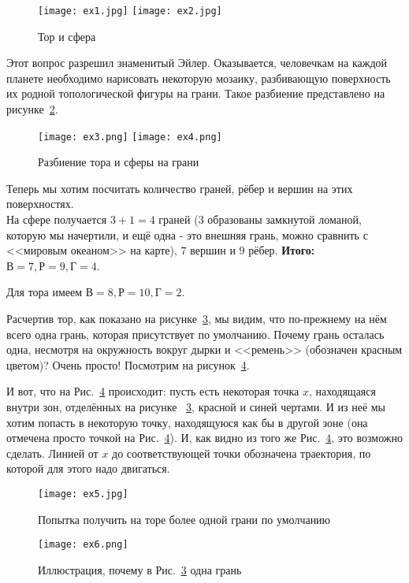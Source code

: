 \begin{figure}[ht]

    \centering
                    
    \texttt{[image: ex1.jpg]}
    \texttt{[image: ex2.jpg]}  
    \caption{Тор и сфера}
                    
    \label{fig:top1}
                
\end{figure}
\begin{claim*}
    Этот вопрос разрешил знаменитый Эйлер. Оказывается, человечкам на каждой планете необходимо нарисовать некоторую мозаику, разбивающую поверхность их родной топологической фигуры на грани. Такое разбиение представлено на рисунке~\ref{fig:top2}.
    \begin{figure}[ht]
        \centering
        \texttt{[image: ex3.png]}
        \texttt{[image: ex4.png]}  
        \caption{Разбиение тора и сферы на грани}
        \label{fig:top2}
    \end{figure}
    Теперь мы хотим посчитать количество граней, рёбер и вершин на этих поверхностях.\\
    На сфере получается $3+1=4$ граней ($3$ образованы замкнутой ломаной, которую мы начертили, и ещё одна - это внешняя грань, можно сравнить с <<мировым океаном>> на карте), $7$ вершин и $9$ рёбер. \textbf{Итого: }$В = 7, Р = 9, Г = 4$.
    
    Для тора имеем $В=8, Р=10, Г=2$.
    \begin{explanation*}
        Расчертив тор, как показано на рисунке~\ref{fig:top3}, мы видим, что по-прежнему на нём всего одна грань, которая присутствует по умолчанию. Почему грань осталась одна, несмотря на окружность вокруг дырки и <<ремень>> (обозначен красным цветом)? Очень просто! Посмотрим на рисунок~\ref{fig:top4}.
        
        И вот, что на Рис.~\ref{fig:top4} происходит: пусть есть некоторая точка $x$, находящаяся внутри зон, отделённых на рисунке ~\ref{fig:top3}, красной и синей чертами. И из неё мы хотим попасть в некоторую точку, находящуюся как бы в другой зоне (она отмечена просто точкой на Рис.~\ref{fig:top4}). И, как видно из того же Рис.~\ref{fig:top4}, это возможно сделать. Линией от $x$ до соответствующей точки обозначена траектория, по которой для этого надо двигаться.
        
    \begin{figure}[ht]
        \centering
        \texttt{[image: ex5.jpg]}
        \caption{Попытка получить на торе более одной грани по умолчанию}
        \label{fig:top3}
    \end{figure}
    \begin{figure}[ht]
        \centering
        \texttt{[image: ex6.png]}
        \caption{Иллюстрация, почему в Рис.~\ref{fig:top3} одна грань}
        \label{fig:top4}
    \end{figure}
    

\end{explanation*}
\end{claim*}
